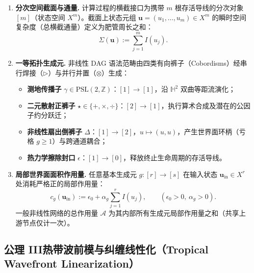 \documentclass[11pt,a4paper]{ctexart}
\theoremstyle{plain}
\theoremstyle{definition}
\newcommand{\HH}{\mathbb{H}}
\newcommand{\ZZ}{\mathbb{Z}}
\newcommand{\cA}{\mathcal{A}}
\newcommand{\PSL}{\mathrm{PSL}}
\begin{document}
\begin{enumerate}
\item \textbf{分次空间截面与通量.} 计算过程的横截接口为携带 $m$ 根存活导线的分次对象 $[m]$（状态空间 $X^m$）。截面上状态元组 $\mathbf{u} = (u_1, \dots, u_m) \in X^m$ 的瞬时空间复杂度（总横截通量）定义为肥管周长之和：
\[
\Sigma(\mathbf{u}) := \sum_{j=1}^{m} I(u_j).
\]

\item \textbf{一等拓扑生成元.} 非线性 DAG 语法范畴由四类有向裤子（Cobordisms）经串行焊接（$\rhd$）与并行并置（$\otimes$）生成：
\begin{itemize}
\item \textbf{测地传播子} $\gamma \in \PSL(2, \ZZ)$：$[1] \to [1]$，沿 $\HH^2$ 双曲等距流演化；
\item \textbf{二元散射正裤子} $\star \in \{+, \times, \div\}$：$[2] \to [1]$，执行算术合成及潜在的公因子约分跃迁；
\item \textbf{非线性扇出倒裤子} $\Delta$：$[1] \to [2]$，$u \mapsto (u, u)$，产生世界面环柄（亏格 $g \ge 1$）与跨通道耦合；
\item \textbf{热力学擦除封口} $\epsilon$：$[1] \to [0]$，释放终止生命周期的存活导线。
\end{itemize}

\item \textbf{局部世界面面积作用量.} 任意基本生成元 $g: [r] \to [s]$ 在输入状态 $\mathbf{u}_{\mathrm{in}} \in X^r$ 处消耗严格正的局部作用量：
\[
c_g(\mathbf{u}_{\mathrm{in}}) := \epsilon_0 + \alpha_g \sum_{j=1}^{r} I(u_j),
\qquad (\epsilon_0 > 0,\ \alpha_g > 0).
\]
一般非线性网络的总作用量 $\cA$ 为其内部所有生成元局部作用量之和（共享上游节点仅计一次）。
\end{enumerate}

\subsection*{公理 III\quad 热带波前模与纠缠线性化（Tropical Wavefront Linearization）}
\end{document}
